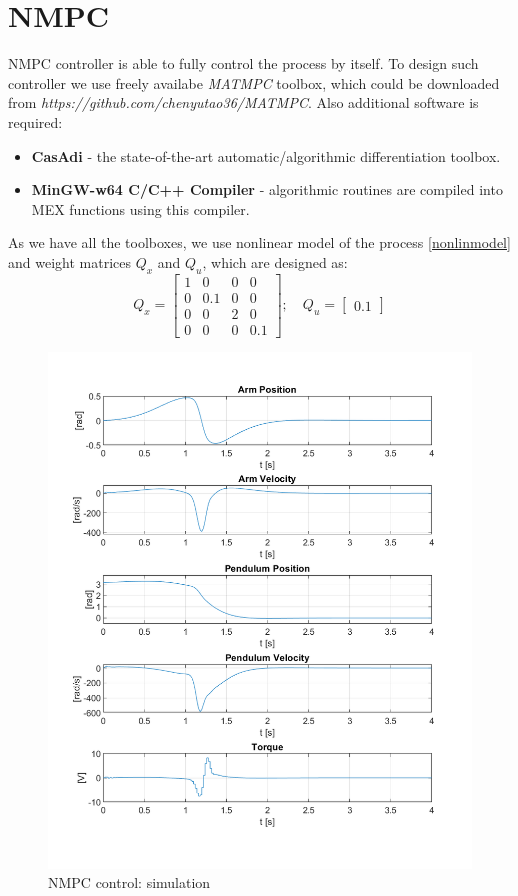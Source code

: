 \section{NMPC}
NMPC controller is able to fully control the process by itself. To design such controller we use freely availabe \textit{MATMPC} toolbox, which could be downloaded from \textit{https://github.com/chenyutao36/MATMPC}. Also additional software is required:
\begin{itemize}
	\item \textbf{CasAdi} - the state-of-the-art automatic/algorithmic differentiation toolbox.
	\item \textbf{MinGW-w64 C/C++ Compiler} - algorithmic routines are compiled
	into MEX functions using this compiler.
\end{itemize}
As we have all the toolboxes, we use nonlinear model of the process \ref{nonlinmodel} and weight matrices $Q_x$ and $Q_u$, which are designed as:
\begin{equation}
	Q_x = \begin{bmatrix}
	1&0&0&0\\
	0&0.1&0&0\\
	0&0&2&0\\
	0&0&0&0.1
	\end{bmatrix}; \quad Q_u = \begin{bmatrix}0.1\end{bmatrix}
\end{equation}
\begin{figure}[h]
	\centering
	\includegraphics[width=.6\linewidth]{images/NMPC}
	\caption{NMPC control: simulation}
	\label{NMPC}
\end{figure}
